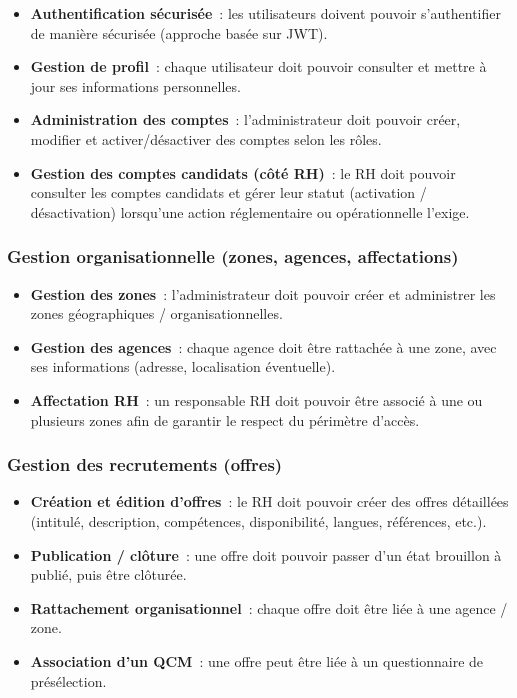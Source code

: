 \begin{itemize}
  \item \textbf{Authentification sécurisée}~: les utilisateurs doivent pouvoir
        s'authentifier de manière sécurisée (approche basée sur JWT).
  \item \textbf{Gestion de profil}~: chaque utilisateur doit pouvoir consulter
        et mettre à jour ses informations personnelles.
  \item \textbf{Administration des comptes}~: l'administrateur doit pouvoir
        créer, modifier et activer/désactiver des comptes selon les rôles.
  \item \textbf{Gestion des comptes candidats (côté RH)}~: le RH doit pouvoir
        consulter les comptes candidats et gérer leur statut (activation /
        désactivation) lorsqu'une action réglementaire ou opérationnelle
        l'exige.
\end{itemize}


\subsubsection{Gestion organisationnelle (zones, agences, affectations)}

\begin{itemize}
  \item \textbf{Gestion des zones}~: l'administrateur doit pouvoir créer et
        administrer les zones géographiques / organisationnelles.
  \item \textbf{Gestion des agences}~: chaque agence doit être rattachée à une
        zone, avec ses informations (adresse, localisation éventuelle).
  \item \textbf{Affectation RH}~: un responsable RH doit pouvoir être associé
        à une ou plusieurs zones afin de garantir le respect du périmètre
        d'accès.
\end{itemize}


\subsubsection{Gestion des recrutements (offres)}

\begin{itemize}
  \item \textbf{Création et édition d'offres}~: le RH doit pouvoir créer des
        offres détaillées (intitulé, description, compétences, disponibilité,
        langues, références, etc.).
  \item \textbf{Publication / clôture}~: une offre doit pouvoir passer d'un
        état brouillon à publié, puis être clôturée.
  \item \textbf{Rattachement organisationnel}~: chaque offre doit être liée
        à une agence / zone.
  \item \textbf{Association d'un QCM}~: une offre peut être liée à un
        questionnaire de présélection.
\end{itemize}


